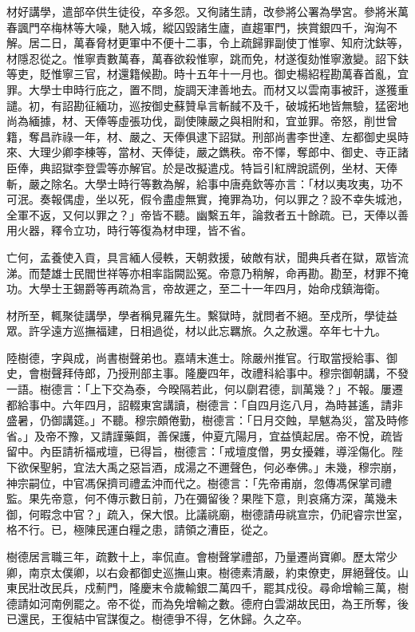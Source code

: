 \begin{pinyinscope}
材好講學，遣部卒供生徒役，卒多怨。又徇諸生請，改參將公署為學宮。參將米萬春諷門卒梅林等大噪，馳入城，縱囚毀諸生廬，直趨軍門，挾賞銀四千，洶洶不解。居二日，萬春脅材更軍中不便十二事，令上疏歸罪副使丁惟寧、知府沈鈇等，材隱忍從之。惟寧責數萬春，萬春欲殺惟寧，跳而免，材遂復劾惟寧激變。詔下鈇等吏，貶惟寧三官，材還籍候勘。時十五年十一月也。御史楊紹程勘萬春首亂，宜罪。大學士申時行庇之，置不問，旋調天津善地去。而材又以雲南事被訐，遂獲重譴。初，有詔勘征緬功，巡按御史蘇贊阜言斬馘不及千，破城拓地皆無驗，猛密地尚為緬據，材、天俸等虛張功伐，副使陳嚴之與相附和，宜並罪。帝怒，削世曾籍，奪昌祚祿一年，材、嚴之、天俸俱逮下詔獄。刑部尚書李世達、左都御史吳時來、大理少卿李棟等，當材、天俸徒，嚴之鐫秩。帝不懌，奪郎中、御史、寺正諸臣俸，典詔獄李登雲等亦解官。於是改擬遣戍。特旨引紅牌說謊例，坐材、天俸斬，嚴之除名。大學士時行等數為解，給事中唐堯欽等亦言：「材以夷攻夷，功不可泯。奏報偶虛，坐以死，假令盡虛無實，掩罪為功，何以罪之？設不幸失城池，全軍不返，又何以罪之？」帝皆不聽。幽繫五年，論救者五十餘疏。已，天俸以善用火器，釋令立功，時行等復為材申理，皆不省。

亡何，孟養使入貢，具言緬人侵軼，天朝救援，破敵有狀，聞典兵者在獄，眾皆流涕。而楚雄士民閻世祥等亦相率詣闕訟冤。帝意乃稍解，命再勘。勘至，材罪不掩功。大學士王錫爵等再疏為言，帝故遲之，至二十一年四月，始命戍鎮海衛。

材所至，輒聚徒講學，學者稱見羅先生。繫獄時，就問者不絕。至戍所，學徒益眾。許孚遠方巡撫福建，日相過從，材以此忘羈旅。久之赦還。卒年七十九。

陸樹德，字與成，尚書樹聲弟也。嘉靖末進士。除嚴州推官。行取當授給事、御史，會樹聲拜侍郎，乃授刑部主事。隆慶四年，改禮科給事中。穆宗御朝講，不發一語。樹德言：「上下交為泰，今暌隔若此，何以劘君德，訓萬幾？」不報。屢遷都給事中。六年四月，詔輟東宮講讀，樹德言：「自四月迄八月，為時甚遙，請非盛暑，仍御講筵。」不聽。穆宗頗倦勤，樹德言：「日月交蝕，旱魃為災，當及時修省。」及帝不豫，又請謹藥餌，善保護，仲夏亢陽月，宜益慎起居。帝不悅，疏皆留中。內臣請祈福戒壇，已得旨，樹德言：「戒壇度僧，男女擾雜，導淫傷化。陛下欲保聖躬，宜法大禹之惡旨酒，成湯之不邇聲色，何必奉佛。」未幾，穆宗崩，神宗嗣位，中官馮保擠司禮孟沖而代之。樹德言：「先帝甫崩，忽傳馮保掌司禮監。果先帝意，何不傳示數日前，乃在彌留後？果陛下意，則哀痛方深，萬幾未御，何暇念中官？」疏入，保大恨。比議祧廟，樹德請毋祧宣宗，仍祀睿宗世室，格不行。已，極陳民運白糧之患，請領之漕臣，從之。

樹德居言職三年，疏數十上，率侃直。會樹聲掌禮部，乃量遷尚寶卿。歷太常少卿，南京太僕卿，以右僉都御史巡撫山東。樹德素清嚴，約束僚吏，屏絕聲伎。山東民壯改民兵，戍薊門，隆慶末令歲輸銀二萬四千，罷其戍役。尋命增輸三萬，樹德請如河南例罷之。帝不從，而為免增輸之數。德府白雲湖故民田，為王所奪，後已還民，王復結中官謀復之。樹德爭不得，乞休歸。久之卒。


\end{pinyinscope}
